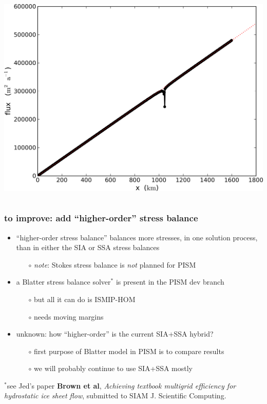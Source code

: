\documentclass[hide notes,intlimits]{beamer}
\begin{document}
\begin{frame}
\begin{columns}
\begin{column}{0.4\textwidth}
\begin{center}
\bigskip
    \includegraphics[width=1.0\textwidth]{fluxA3}
  \end{center}
\end{column}
\end{columns}
\end{frame}


\begin{frame}
  \frametitle{to improve: add ``higher-order'' stress balance}
  \begin{itemize}
  \item ``higher-order stress balance'' balances more stresses, in one solution process, than in either the SIA or SSA stress balances
    \begin{itemize}
    \item[$\circ$]  \emph{note}: Stokes stress balance is \emph{not} planned for PISM
    \end{itemize}
  \item a Blatter stress balance solver$^{*}$ is present in the PISM dev branch
    \begin{itemize}
    \item[$\circ$] but all it can do is ISMIP-HOM
    \item[$\circ$] needs moving margins
    \end{itemize}    
  \item unknown: how ``higher-order'' is the current SIA+SSA hybrid?
    \begin{itemize}
    \item[$\circ$] first purpose of Blatter model in PISM is to compare results    
    \item[$\circ$] we will probably continue to use SIA+SSA mostly
    \end{itemize}    
  \end{itemize}

 \begin{flushleft}
   \scriptsize
    $^{*}$see Jed's paper \textbf{Brown et al},
    \emph{Achieving textbook multigrid efficiency for hydrostatic ice sheet
      flow}, submitted to SIAM J. Scientific Computing.
  \end{flushleft}
\end{frame}
\end{document}
